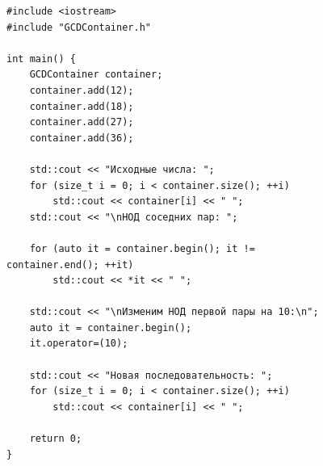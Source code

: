 \documentclass[a4paper, 14pt]{extarticle}
\begin{document}
\begin{figure}[!htb]
\begin{lstlisting}[caption={\texttt{main.cpp} для \texttt{GCDContainer}},label={lst:gcd-main}]
#include <iostream>
#include "GCDContainer.h"

int main() {
    GCDContainer container;
    container.add(12);
    container.add(18);
    container.add(27);
    container.add(36);

    std::cout << "Исходные числа: ";
    for (size_t i = 0; i < container.size(); ++i)
        std::cout << container[i] << " ";
    std::cout << "\nНОД соседних пар: ";

    for (auto it = container.begin(); it != container.end(); ++it)
        std::cout << *it << " ";

    std::cout << "\nИзменим НОД первой пары на 10:\n";
    auto it = container.begin();
    it.operator=(10);

    std::cout << "Новая последовательность: ";
    for (size_t i = 0; i < container.size(); ++i)
        std::cout << container[i] << " ";

    return 0;
}
\end{lstlisting}
\end{figure}
\clearpage
\end{document}
